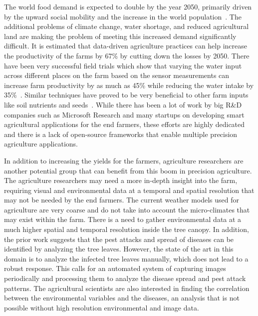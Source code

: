 
The world food demand is expected to double by the year 2050, primarily driven by the upward social mobility and the increase in the world population~\cite{godfray2010food}. 
The additional problems of climate change, water shortage, and reduced agricultural land are making the problem of meeting this increased demand significantly difficult. 
It is estimated that data-driven agriculture practices can help increase the productivity of the farms by 67\% by cutting down the losses by 2050. 
There have been very successful field trials which show that varying the water input across different places on the farm based on the sensor measurements can increase farm productivity by as much as 45\% while reducing the water intake by 35\%~\cite{almarshadi2011effects}.  Similar techniques have proved to be very beneficial to other farm inputs like soil nutrients and seeds~\cite{kim2009soil}. While there has been a lot of work by big R\&D companies such as Microsoft Research and many startups on developing smart agricultural applications for the end farmers, these efforts are highly dedicated and there is a lack of open-source frameworks that enable multiple precision agriculture applications.

In addition to increasing the yields for the farmers, agriculture researchers are another potential group that can benefit from this boom in precision agriculture. The agriculture researchers may need a more in-depth insight into the farm, requiring visual and environmental data at a temporal and spatial resolution that may not be needed by the end farmers. 
The current weather models used for agriculture are very coarse and do not take into account the micro-climates that may exist within the farm. 
There is a need to gather environmental data at a much higher spatial and temporal resolution inside the tree canopy. In addition, the prior work suggests that the pest attacks and spread of diseases can be identified by analyzing the tree leaves. However, the state of the art in this domain is to analyze the infected tree leaves manually, which does not lead to a robust response. This calls for an automated system of capturing images periodically and processing them to analyze the disease spread and pest attack patterns. The agricultural scientists are also interested in finding the correlation between the environmental variables and the diseases, an analysis that is not possible without high resolution environmental and image data.

